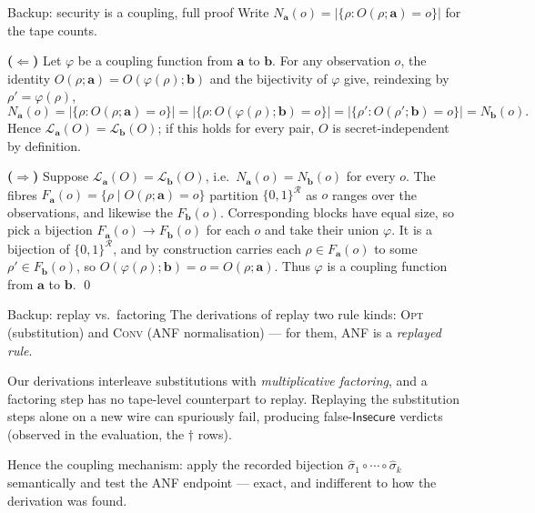 \documentclass[aspectratio=169,10pt]{beamer}
\newcommand{\Insecure}{\textsf{Insecure}}
\newcommand{\Rs}{\mathcal{R}}
\newcommand{\law}[1]{\mathcal{L}_{#1}}
\newcommand{\va}{\mathbf{a}}
\newcommand{\vb}{\mathbf{b}}
\begin{document}
\begin{frame}{Backup: security is a coupling, full proof}
  \small
  Write $N_{\va}(o) = \bigl|\{\rho : O(\rho;\va) = o\}\bigr|$ for the tape counts.
  \medskip

  \textbf{($\Leftarrow$)} \; Let $\varphi$ be a coupling function from $\va$ to
  $\vb$. For any observation $o$, the identity $O(\rho;\va) = O(\varphi(\rho);\vb)$
  and the bijectivity of $\varphi$ give, reindexing by $\rho' = \varphi(\rho)$,
  \[
    N_{\va}(o)
    = \bigl|\{\rho : O(\rho;\va) = o\}\bigr|
    = \bigl|\{\rho : O(\varphi(\rho);\vb) = o\}\bigr|
    = \bigl|\{\rho' : O(\rho';\vb) = o\}\bigr|
    = N_{\vb}(o) .
  \]
  Hence $\law{\va}(O) = \law{\vb}(O)$; if this holds for every pair, $O$ is
  secret-independent by definition.
  \medskip

  \textbf{($\Rightarrow$)} \; Suppose $\law{\va}(O) = \law{\vb}(O)$, i.e.\
  $N_{\va}(o) = N_{\vb}(o)$ for every $o$. The fibres
  $F_{\va}(o) = \{\rho \mid O(\rho;\va) = o\}$ partition $\{0,1\}^{\Rs}$ as $o$
  ranges over the observations, and likewise the $F_{\vb}(o)$. Corresponding blocks
  have equal size, so pick a bijection $F_{\va}(o) \to F_{\vb}(o)$ for each $o$ and
  take their union $\varphi$. It is a bijection of $\{0,1\}^{\Rs}$, and by
  construction carries each $\rho \in F_{\va}(o)$ to some $\rho' \in F_{\vb}(o)$, so
  $O(\varphi(\rho);\vb) = o = O(\rho;\va)$. Thus $\varphi$ is a coupling function
  from $\va$ to $\vb$. \qed
\end{frame}

\begin{frame}{Backup: replay vs.\ factoring}
  The derivations of \textcite{barthe2015verified} replay two rule kinds: \textsc{Opt}
  (substitution) and \textsc{Conv} (ANF normalisation) --- for them, ANF is a
  \emph{replayed rule}.
  \medskip

  Our derivations interleave substitutions with \emph{multiplicative
  factoring}, and a factoring step has no tape-level counterpart to replay.
  Replaying the substitution steps alone on a new wire can spuriously fail,
  producing false-$\Insecure$ verdicts (observed in the evaluation, the
  $\dagger$ rows).
  \medskip

  Hence the coupling mechanism: apply the recorded bijection
  $\widehat{\sigma}_1 \circ \cdots \circ \widehat{\sigma}_k$ semantically and
  test the ANF endpoint --- exact, and indifferent to how the derivation was
  found.
\end{frame}
\end{document}
